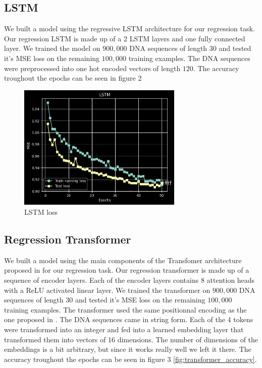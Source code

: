 \documentclass{article}
\begin{document}
\subsection{LSTM}
We built a model using the regressive LSTM architecture for our regression task. Our regression LSTM is made up of a 2 LSTM layers and one fully connected layer. We trained the model on $900, 000$ DNA sequences of length $30$ and tested it's MSE loss on the remaining $100,000$ training examples. The DNA sequences were preprocessed into one hot encoded vectors of length $120$. The accuracy troughout the epochs can be seen in figure 2
\begin{figure} \label{fig:lstm}
    \caption{LSTM loss} \center
    \includegraphics[width=0.7\textwidth]{images/lstm.png}
\end{figure}

\subsection{Regression Transformer}
We built a model using the main components of the Transfomer architecture proposed in \cite{transformers} for our regression task. Our regression transformer is made up of a sequence of encoder layers. Each of the encoder layers contains 8 attention heads with a ReLU activated linear layer. We trained the transformer on $900, 000$ DNA sequences of length $30$ and tested it's MSE loss on the remaining $100,000$ training examples. The transformer used the same positionnal encoding as the one proposed in \cite{transformers}. The DNA sequences came in string form. Each of the 4 tokens were transformed into an integer and fed into a learned embedding layer that transformed them into vectors of 16 dimensions. The number of dimensions of the embeddings is a bit arbitrary, but since it works really well we left it there. The accuracy troughout the epochs can be seen in figure 3 \ref{fig:transformer_accuracy}. 
\end{document}

